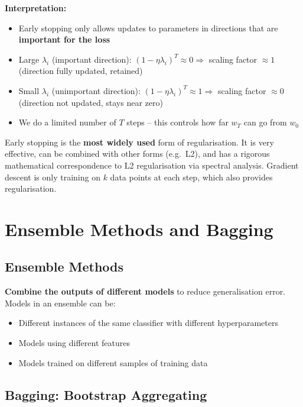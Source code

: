 \documentclass[12pt,a4paper]{article}
\begin{document}
\textbf{Interpretation:}
\begin{itemize}
  \item Early stopping only allows updates to parameters in directions that are \textbf{important for the loss}
  \item Large $\lambda_i$ (important direction): $(1-\eta\lambda_i)^T \approx 0 \Rightarrow$ scaling factor $\approx 1$ (direction fully updated, retained)
  \item Small $\lambda_i$ (unimportant direction): $(1-\eta\lambda_i)^T \approx 1 \Rightarrow$ scaling factor $\approx 0$ (direction not updated, stays near zero)
  \item We do a limited number of $T$ steps -- this controls how far $w_T$ can go from $w_0$
\end{itemize}

\begin{keybox}
Early stopping is the \textbf{most widely used} form of regularisation. It is very effective, can be combined with other forms (e.g.\ L2), and has a rigorous mathematical correspondence to L2 regularisation via spectral analysis. Gradient descent is only training on $k$ data points at each step, which also provides regularisation.
\end{keybox}

\section{Ensemble Methods and Bagging}

\subsection{Ensemble Methods}

\textbf{Combine the outputs of different models} to reduce generalisation error. Models in an ensemble can be:
\begin{itemize}
  \item Different instances of the same classifier with different hyperparameters
  \item Models using different features
  \item Models trained on different samples of training data
\end{itemize}

\subsection{Bagging: Bootstrap Aggregating}
\end{document}

